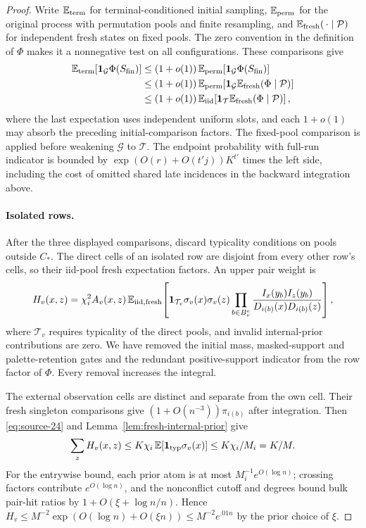 \begin{proof}
Write \(\mathbb E_{\rm term}\) for terminal-conditioned initial
sampling, \(\mathbb E_{\rm perm}\) for the original process with
permutation pools and finite resampling, and
\(\mathbb E_{\rm fresh}(\,\cdot\mid\mathcal P)\) for independent
fresh states on fixed pools. The zero convention in the definition
of \(\Phi\) makes it a nonnegative test on all configurations.
These comparisons give
\[
\begin{aligned}
\mathbb E_{\rm term}\!\left[\mathbf1_{\mathcal G}\Phi(S_{\rm fin})\right]
&\le (1+o(1))\,
 \mathbb E_{\rm perm}\!\left[\mathbf1_{\mathcal G}\Phi(S_{\rm fin})\right]\\
&\le (1+o(1))\,
 \mathbb E_{\rm perm}\!\left[\mathbf1_{\mathcal G}
       \mathbb E_{\rm fresh}(\Phi\mid\mathcal P)\right]\\
&\le (1+o(1))\,
 \mathbb E_{\rm iid}\!\left[\mathbf1_{\mathcal T}
       \mathbb E_{\rm fresh}(\Phi\mid\mathcal P)\right],
\end{aligned}
\]
where the last expectation uses independent uniform slots, and each \(1+o(1)\) may absorb the preceding initial-comparison factors. The fixed-pool comparison is applied before weakening \(\mathcal G\) to \(\mathcal T\). The endpoint probability with full-run indicator is bounded by \(\exp(O(r)+O(t'j))K^{t'}\) times the left side, including the cost of omitted shared late incidences in the backward integration above.

\paragraph{Isolated rows.}
After the three displayed comparisons, discard typicality conditions
on pools outside \(C_*\). The direct cells of an isolated row are
disjoint from every other row's cells, so their iid-pool fresh
expectation factors. An upper pair weight is
\[
 H_v(x,z)=\chi_i^2 A_v(x,z)\,
 \mathbb E_{\rm iid,fresh}\!\left[
 \mathbf1_{\mathcal T_v}\sigma_v(x)\sigma_v(z)
 \prod_{b\in B_v^e}
       \frac{I_x(y_b)I_z(y_b)}{D_{i(b)}(x)D_{i(b)}(z)}\right],
\]
where \(\mathcal T_v\) requires typicality of the direct pools,
and invalid internal-prior contributions are zero. We have removed
the initial mass, masked-support and palette-retention gates and the
redundant positive-support indicator from the row factor of \(\Phi\).
Every removal increases the integral.

The external observation cells are distinct and separate from the
own cell. Their fresh singleton comparisons give
\((1+O(n^{-3}))\pi_{i(b)}\) after integration. Then
\eqref{eq:source-24} and Lemma~\ref{lem:fresh-internal-prior} give
\[
 \sum_z H_v(x,z)
 \le K\chi_i\,\mathbb E[\mathbf1_{\rm typ}\sigma_v(x)]
 \le K\chi_i/M_i=K/M.
\]
For the entrywise bound, each prior atom is at most
\(M_i^{-1}e^{O(\log n)}\); crossing factors contribute
\(e^{O(\log n)}\), and the nonconflict cutoff and degrees bound
bulk pair-hit ratios by \(1+O(\xi+\log n/n)\). Hence
\(H_v\le M^{-2}\exp(O(\log n)+O(\xi n))\le M^{-2}e^{.01n}\)
by the prior choice of \(\xi\).


\end{proof}
